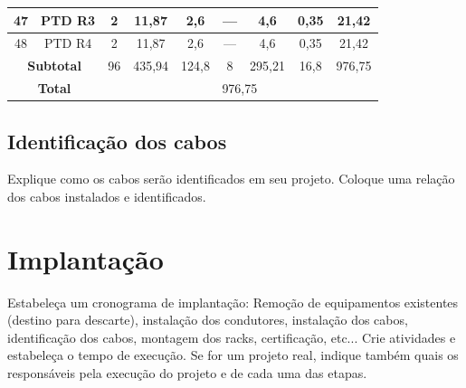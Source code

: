 \documentclass[	DIV=calc,%
							paper=a4,%
							fontsize=12pt,%
							onecolumn]{scrartcl}	 					%
\begin{document}
\begin{tabular}{|c|c|c|c|c|c|c|c|c|}
	47                 & PTD R3             & 2                                                    & 11,87                                       & 2,6                                           & ---                                           & 4,6                                              & 0,35                                            & 21,42                                                             \\ \hline
	48                 & PTD R4             & 2                                                    & 11,87                                       & 2,6                                           & ---                                           & 4,6                                              & 0,35                                            & 21,42                                                             \\ \hline
	\multicolumn{2}{|c|}{\textbf{Subtotal}} & 96                                                   & 435,94                                      & 124,8                                         & 8                                             & 295,21                                           & 16,8                                            & 976,75                                                            \\ \hline
	\multicolumn{2}{|c|}{\textbf{Total}}    & \multicolumn{7}{c|}{976,75}                                                                                                                                                                                                                                                                                                                                                 \\ \hline
\end{tabular}
\clearpage
{}
\recalctypearea

\subsection{Identificação dos cabos}
Explique como os cabos serão identificados em seu projeto. Coloque uma relação dos cabos instalados e identificados.

\section{Implantação}
Estabeleça um cronograma de implantação:
Remoção de equipamentos existentes (destino para descarte), instalação dos condutores, instalação dos cabos, 
identificação dos cabos, montagem dos racks, certificação, etc... Crie atividades e estabeleça o tempo de execução. Se for um projeto real, indique também quais os responsáveis pela execução do projeto e de cada uma das etapas.
\end{document}
